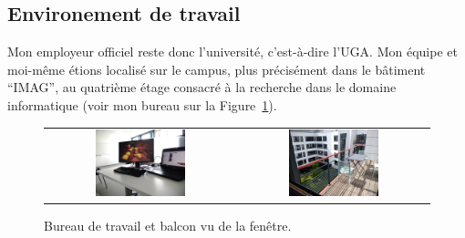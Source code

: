 \subsection{Environement de travail}

Mon employeur officiel reste donc l'université, c'est-à-dire l'UGA. Mon équipe 
et moi-même étions localisé sur le campus, plus précisément dans le bâtiment 
``IMAG'', au quatrième étage consacré à la recherche dans le domaine 
informatique (voir mon bureau sur la Figure~\ref{fig:imag}).

\begin{figure}[h!t] \centering
    \begin{tabular}{@{}c@{\hspace{5pt}}c@{}}
    \includegraphics[width=0.49\textwidth]{images/desk} & \includegraphics[width=0.49\textwidth]{images/balcony}
    \end{tabular}
    \caption{Bureau de travail et balcon vu de la fenêtre.}
    \label{fig:imag}
\end{figure}
